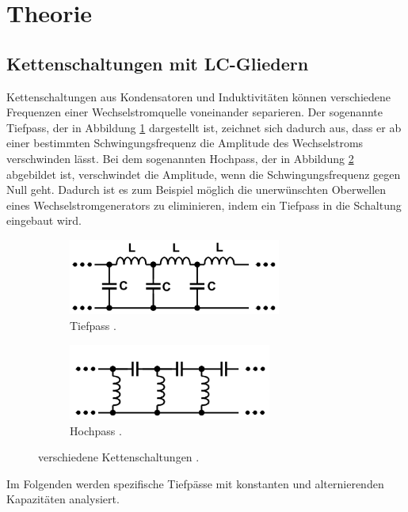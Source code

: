 \section{Theorie}
\label{sec:Theorie}

\subsection{Kettenschaltungen mit LC-Gliedern}

Kettenschaltungen aus Kondensatoren und Induktivitäten können verschiedene
Frequenzen einer Wechselstromquelle voneinander separieren.
Der sogenannte Tiefpass, der in Abbildung \ref{subfig:Tiefpass}
dargestellt ist, zeichnet
sich dadurch aus, dass er ab einer bestimmten Schwingungsfrequenz die Amplitude
des Wechselstroms verschwinden lässt.
Bei dem sogenannten Hochpass, der in Abbildung \ref{subfig:Hochpass}
abgebildet ist, verschwindet
die Amplitude, wenn die Schwingungsfrequenz gegen Null geht.
Dadurch ist es zum Beispiel möglich die unerwünschten Oberwellen eines
Wechselstromgenerators zu eliminieren, indem ein Tiefpass in die
Schaltung eingebaut wird.

\begin{figure}
  \centering
  \begin{subfigure}{0.48\textwidth}
    \centering
    \includegraphics[height=2.5cm]{Tiefpass.png}
    \caption{Tiefpass \cite{anleitung}.}
    \label{subfig:Tiefpass}
  \end{subfigure}
  \begin{subfigure}{0.48\textwidth}
    \centering
    \includegraphics[height=2.5cm]{Hochpass.png}
    \caption{Hochpass \cite{anleitung}.}
    \label{subfig:Hochpass}
  \end{subfigure}
  \caption{verschiedene Kettenschaltungen \cite{anleitung}.}
  \label{fig:Ketten}
\end{figure}

Im Folgenden werden spezifische Tiefpässe mit konstanten und
alternierenden Kapazitäten analysiert.


